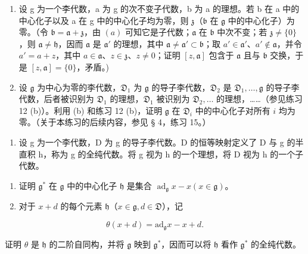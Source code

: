 \begin{enumerate}
\def\labelenumi{(\alph{enumi})}
\setcounter{enumi}{1}
\item
  设 g 为一个李代数，a 为 g 的次不变子代数，b 为 a 的理想。若 b 在 a 中的中心化子以及 a 在 g 中的中心化子均为零，则 \(\mathfrak{z}\)（\(\mathfrak{b}\) 在 \(\mathfrak{g}\) 中的中心化子）为零。（令 \(\mathfrak{b} = \mathfrak{a} + \mathfrak{z}\)，由 \((a)\) 可知它是子代数；\(\mathfrak{a}\) 在 \(\mathfrak{b}\) 中次不变；若 \(\mathfrak{z} \neq \{0\}\)，则 \(\mathfrak{a} \neq \mathfrak{h}\)，因而 \(\mathfrak{a}\) 是 \(\mathfrak{a}'\) 的理想，其中 \(\mathfrak{a} \neq \mathfrak{a}' \subset \mathfrak{b}\)；取 \(a' \in \mathfrak{a}'\)、\(a' \notin \mathfrak{a}\)，并令 \(a' = a + z\)，其中 \(a \in \mathfrak{a}\)、\(z \in \mathfrak{z}\)、\(z \neq 0\)；证明 \([z, \mathfrak{a}]\) 包含于 \(\mathfrak{a}\) 且与 \(\mathfrak{b}\) 交换，于是 \([z, \mathfrak{a}] = \{0\}\)，矛盾。)
\item
设 \(\mathfrak{g}\) 为中心为零的李代数，\(\mathfrak{D}_1\) 为 \(\mathfrak{g}\) 的导子李代数，\(\mathfrak{D}_2\) 是 \(\mathfrak{D}_1, \ldots, \mathfrak{g}\) 的导子李代数，后者被识别为 \(\mathfrak{D}_1\) 的理想，\(\mathfrak{D}_1\) 被识别为 \(\mathfrak{D}_2, \ldots\) 的理想，……（参见练习 12 (b)）。利用 (b) 和练习 12 (b)，证明 \(\mathfrak{g}\) 在 \(\mathfrak{D}_i\) 中的中心化子对所有 \(i\) 均为零。（关于本练习的后续内容，参见 § 4，练习 15。）
\end{enumerate}

\begin{enumerate}
\def\labelenumi{\arabic{enumi}.}
\setcounter{enumi}{15}
\tightlist
\item
  设 g 为一个李代数，D 为 g 的导子李代数。D 的恒等映射定义了 D 与 g 的半直积 h，称为 g 的全纯代数。将 g 视为 h 的一个理想，将 D 视为 h 的一个子代数。
\end{enumerate}

\begin{enumerate}
\def\labelenumi{(\alph{enumi})}
\item
  证明 \(\mathfrak{g}^*\) 在 \(\mathfrak{g}\) 中的中心化子 \(\mathfrak{h}\) 是集合 \(\operatorname{ad}_{\mathfrak{g}}x - x(x\in \mathfrak{g})\)。
\item
  对于 \(x + d\) 的每个元素 \(\mathfrak{h}\)（\(x \in \mathfrak{g}, d \in \mathfrak{D}\)），记
\end{enumerate}

\[
\theta (x + d) = \mathrm{ad} _ {\mathfrak {g}} x - x + d.
\]

证明 \(\theta\) 是 \(\mathfrak{h}\) 的二阶自同构，并将 \(\mathfrak{g}\) 映到 \(\mathfrak{g}^*\)，因而可以将 \(\mathfrak{h}\) 看作 \(\mathfrak{g}^*\) 的全纯代数。

